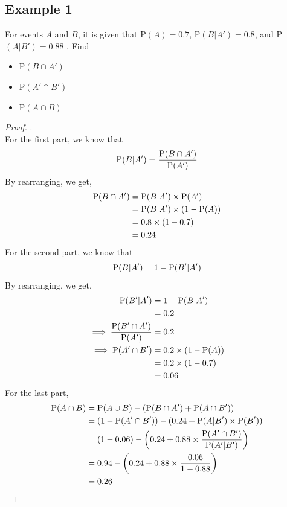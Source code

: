 \documentclass[../setup.tex]{subfiles}
\begin{document}
\subsection{Example 1}
\begin{example}[9740/2013/02/Q8]
For events $A$ and $B$, it is given that P$(A)=0.7$, P$(B|A')=0.8$, and P$(A|B')=0.88$ . Find
\begin{itemize}
	\item P$(B \cap A')$
	\item P$(A' \cap B')$
	\item P$(A \cap B)$
\end{itemize}
\end{example}
\begin{proof}. \\
For the first part, we know that \[ \textup{P}(B|A') = \frac{\textup{P}(B\cap A')}{\textup{P}(A')} \]
By rearranging, we get,
\begin{align*}
\textup{P}(B \cap A') &= \textup{P}(B|A') \times \textup{P}(A') \\
&= \textup{P}(B|A') \times (1 - \textup{P}(A)) \\
&= 0.8 \times (1 - 0.7) \\
&= 0.24 \\
\end{align*}
For the second part, we know that \[ \textup{P}(B|A') = 1 - \textup{P}(B'|A') \] 
By rearranging, we get,
\begin{align*}
\textup{P}(B'|A') &= 1 - \textup{P}(B|A') \\
&= 0.2 \\
\implies \frac{\textup{P}(B' \cap A')}{\textup{P}(A')} &= 0.2 \\
\implies \textup{P}(A' \cap B') &= 0.2 \times (1-\textup{P}(A)) \\
&=  0.2 \times (1-0.7) \\
& = 0.06
\end{align*}
For the last part, 
\begin{align*}
\textup{P}(A \cap B) &= \textup{P}(A \cup B) - \left(\textup{P}(B \cap A') + \textup{P}(A \cap B')\right) \\
&= \left(1 - \textup{P}(A' \cap B')\right) - \left(0.24 + \textup{P}(A|B') \times \textup{P}(B')\right) \\
&= (1 - 0.06) - \left(0.24 + 0.88\times \frac{\textup{P}(A' \cap B')}{\textup{P}(A'|B')} \right) \\
&= 0.94 - \left(0.24 + 0.88 \times \frac{0.06}{1-0.88} \right) \\
&= 0.26
\end{align*}
\end{proof}
\clearpage
\end{document}
